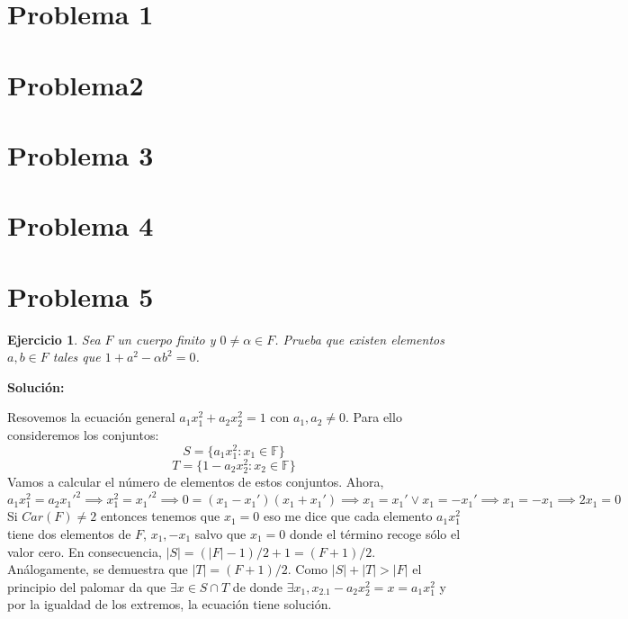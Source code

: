 \documentclass{article}
\theoremstyle{theorem-style}  %
\theoremstyle{definition-style}
\theoremstyle{example-style}
\newtheorem{exercise}{Ejercicio}[section]
\begin{document}
\makeatletter\renewcommand{\ALG@name}{Algoritmo}

\maketitle




\section*{Problema 1}

\newpage
\section*{Problema2}

\newpage
\section*{Problema 3}

\newpage
\section*{Problema 4}

\newpage
\section*{Problema 5}

\begin{exercise}
Sea $F$ un cuerpo finito y $0 \neq \alpha \in F$. Prueba que existen elementos $a,b \in F$ tales que $1+a^2 - \alpha b^2 = 0$. 
\end{exercise}

\textbf{Solución:}

Resovemos la ecuación general $a_1 x_1^2 + a_2 x_2^2 = 1$ con $a_1,a_2 \neq 0$. Para ello consideremos los conjuntos: $$S = \{a_1x_1^2:x_1 \in \mathbb{F} \}$$ $$T = \{1-a_2 x_2^2:x_2 \in \mathbb{F} \}$$ Vamos a calcular el número de elementos de estos conjuntos. Ahora, $$a_1 x_1^2 = a_2 x_1'^2 \implies x_1^2 = x_1'^2 \implies 0 = (x_1 - x_1')(x_1+x_1') \implies x_1 = x_1' \lor x_1 = -x_1' \implies x_1 = -x_1 \implies 2x_1 = 0$$ Si $Car(F) \neq 2$ entonces tenemos que $x_1 = 0$ eso me dice que cada elemento $a_1x_1^2$ tiene dos elementos de $F$, $x_1,-x_1$ salvo que $x_1 = 0$ donde el término recoge sólo el valor cero. En consecuencia, $|S| = (|F|-1)/2 + 1 = (F+1)/2$. Análogamente, se demuestra que $|T| = (F+1)/2$. Como $|S|+|T| > |F|$ el principio del palomar da que $\exists x \in S \cap T$ de donde $\exists x_1,x_2.1-a_2 x_2^2 = x = a_1 x_1^2$ y por la igualdad de los extremos, la ecuación tiene solución. 
\end{document}
